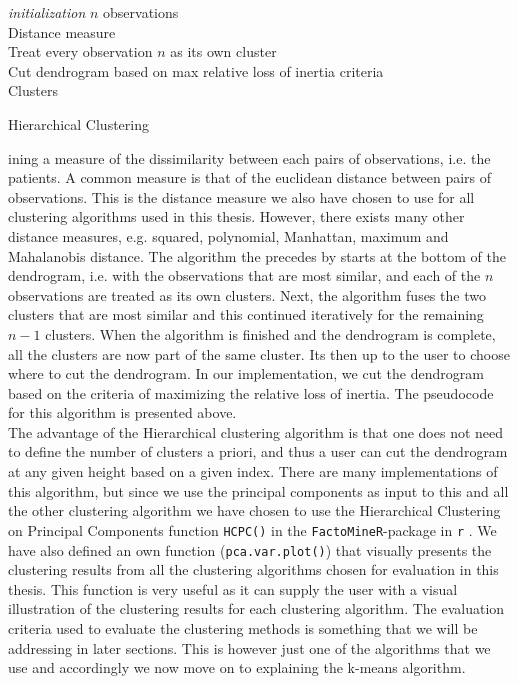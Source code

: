 \documentclass[../thesis.tex]{subfiles}
\begin{document}
\begin{algorithm}[H]{
\SetAlgoLined
\textit{initialization}\;
\hspace*{0,5cm}$n$ observations\\
\hspace*{0,5cm}Distance measure\\
\hspace*{0,5cm}Treat every observation $n$ as its own cluster\\
}
Cut dendrogram based on max relative loss of inertia criteria\\
\Return Clusters
\caption{Hierarchical Clustering}
\end{algorithm}
\newpage
\noindent ining a measure of the dissimilarity between each pairs of observations, i.e. the patients. A common measure is that of the euclidean distance between pairs of observations. This is the distance measure we also have chosen to use for all clustering algorithms used in this thesis. However, there exists many other distance measures, e.g. squared, polynomial, Manhattan, maximum and Mahalanobis distance. The algorithm the precedes by starts at the bottom of the dendrogram, i.e. with the observations that are most similar, and each of the $n$ observations are treated as its own clusters. Next, the algorithm fuses the two clusters that are most similar and this continued iteratively for the remaining $n - 1$ clusters. When the algorithm is finished and the dendrogram is complete, all the clusters are now part of the same cluster. Its then up to the user to choose where to cut the dendrogram. In our implementation, we cut the dendrogram based on the criteria of maximizing the relative loss of inertia. The pseudocode for this algorithm is presented above.\\
\indent The advantage of the Hierarchical clustering algorithm is that one does not need to define the number of clusters a priori, and thus a user can cut the dendrogram at any given height based on a given index. There are many implementations of this algorithm, but since we use the principal components as input to this and all the other clustering algorithm we have chosen to use the Hierarchical Clustering on Principal Components function \texttt{HCPC()} in the \texttt{FactoMineR}-package in \texttt{r} \citep{FactoMineR}. We have also defined an own function (\texttt{pca.var.plot()}) that visually presents the clustering results from all the clustering algorithms chosen for evaluation in this thesis. This function is very useful as it can supply the user with a visual illustration of the clustering results for each clustering algorithm. The evaluation criteria used to evaluate the clustering methods is something that we will be addressing in later sections. This is however just one of the algorithms that we use and accordingly we now move on to explaining the k-means algorithm.
\end{document}
